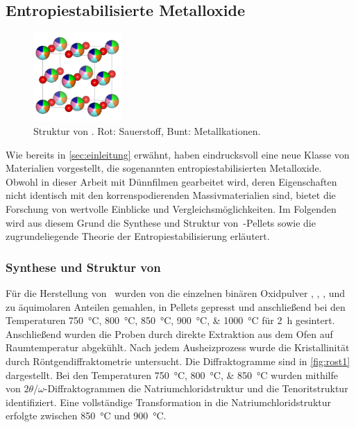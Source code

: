 \subsection{Entropiestabilisierte Metalloxide}\label{subsec:hochentropische-metalloxide}
\begin{figure}
    \centering
    \includegraphics[width=0.3\textwidth]{../assets/theorie/heo}
    \caption{Struktur von \heo. Rot: Sauerstoff, Bunt: Metallkationen.}
    \label{fig:heo}
\end{figure}
Wie bereits in \cref{sec:einleitung} erwähnt, haben  eindrucksvoll eine neue Klasse von
Materialien vorgestellt, die sogenannten entropiestabilisierten Metalloxide.
Obwohl in dieser Arbeit mit Dünnfilmen gearbeitet wird, deren Eigenschaften nicht identisch mit den korrenspodierenden
Massivmaterialien sind, bietet die Forschung von  wertvolle Einblicke und
Vergleichsmöglichkeiten.
Im Folgenden wird aus diesem Grund die Synthese und Struktur von \heo\,-Pellets
sowie die zugrundeliegende Theorie
der Entropiestabilisierung erläutert.

\subsubsection{Synthese und Struktur von \texorpdfstring{\heo}{MgCoNiCuZnO}}\label{subsubsec:heo}
Für die Herstellung von \heo\ wurden von  die einzelnen binären Oxidpulver , ,
,  und  zu äquimolaren Anteilen gemahlen, in Pellets gepresst und anschließend bei den
Temperaturen \qtylist{750;800;850;900;1000}{\celsius} für \qty{2}{\hour} gesintert.
Anschließend wurden die Proben durch direkte Extraktion aus dem Ofen auf Raumtemperatur abgekühlt.
Nach jedem Ausheizprozess wurde die Kristallinität durch Röntgendiffraktometrie untersucht.
Die Diffraktogramme sind in \cref{fig:rost1} dargestellt.
Bei den Temperaturen \qtylist{750;800;850}{\celsius} wurden mithilfe von $2\theta/\omega$-Diffraktogrammen die
Natriumchloridstruktur und die Tenoritstruktur identifiziert.
Eine vollständige Transformation in die Natriumchloridstruktur erfolgte zwischen \qty{850}{\celsius} und \qty{900}{\celsius}.

